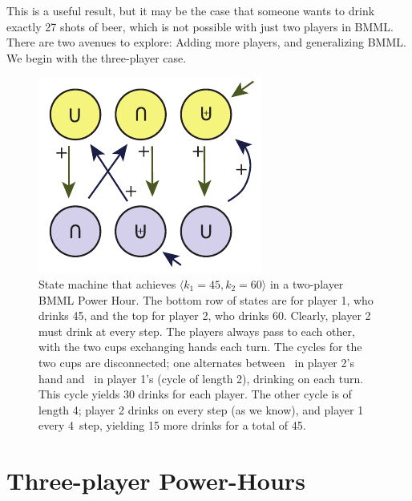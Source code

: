 \documentclass[twocolumn]{article}
\begin{document}
This is a useful result, but it may be the case that someone wants to
drink exactly 27 shots of beer, which is not possible with just two
players in BMML. There are two avenues to explore: Adding more 
players, and generalizing BMML. We begin with the three-player case.

\begin{figure}[ht]
\begin{center}
\includegraphics[width=0.90 \linewidth]{dual45.pdf}
\end{center}\vspace{-0.1in}
\caption{State machine that achieves $\langle k_1=45, k_2=60 \rangle$
  in a two-player BMML Power Hour. The bottom row of states are for
  player 1, who drinks 45, and the top for player 2, who drinks 60.
  Clearly, player 2 must drink at every step. The players always pass
  to each other, with the two cups exchanging hands each turn. The
  cycles for the two cups are disconnected; one alternates between
  \fullcup\ in player 2's hand and \emptycup\ in player 1's (cycle
  of length 2), drinking on each turn. This cycle yields 30 drinks
  for each player. The other cycle is of length 4; player 2 drinks
  on every step (as we know), and player 1 every 4\th\ step, yielding
  15 more drinks for a total of 45.
}
\label{fig:dual45}
\end{figure}

\section{Three-player \kn Power-Hours}
\end{document}

